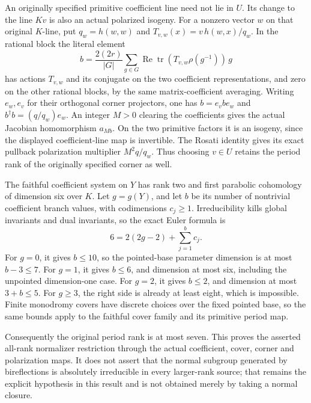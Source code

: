 An originally specified primitive coefficient line need not
lie in \(U\). Its change to the line \(Kv\) is also an
actual polarized isogeny. For a nonzero vector \(w\) on
that original \(K\)-line, put \(q_w=h(w,w)\) and
\(T_{v,w}(x)=v\,h(w,x)/q_w\). In the rational block the
literal element
\[
 b=\frac{2(2r)}{|G|}\sum_{g\in G}
       \operatorname{Re}\operatorname{tr}
               (T_{v,w}\rho(g^{-1}))\,g                    \tag{G29.15a}
\]
has actions \(T_{v,w}\) and its conjugate on the two
coefficient representations, and zero on the other rational
blocks, by the same matrix-coefficient averaging.
Writing \(e_w,e_v\) for their orthogonal corner projectors,
one has \(b=e_vbe_w\) and
\(b^\dagger b=(q/q_w)e_w\).
An integer \(M>0\) clearing the coefficients gives the
actual Jacobian homomorphism \(a_{Mb}\). On the two
primitive factors it is an isogeny, since the displayed
coefficient-line map is invertible. The Rosati identity gives
its exact pullback polarization multiplier \(M^2q/q_w\).
Thus choosing \(v\in U\) retains the period rank of the
originally specified corner as well.

The faithful coefficient system on \(Y\) has rank two
and first parabolic cohomology of dimension six over \(K\).
Let \(g=g(Y)\), and let \(b\) be its number of nontrivial
coefficient branch values, with codimensions \(c_j\ge1\).
Irreducibility kills global invariants and dual invariants,
so the exact Euler formula is
\[
                       6=2(2g-2)+\sum_{j=1}^b c_j.         \tag{G29.16}
\]
For \(g=0\), it gives \(b\le10\), so the pointed-base
parameter dimension is at most \(b-3\le7\). For \(g=1\),
it gives \(b\le6\), and dimension at most six, including
the unpointed dimension-one case. For \(g=2\), it gives
\(b\le2\), and dimension at most \(3+b\le5\).
For \(g\ge3\), the right side is already at least eight,
which is impossible. Finite monodromy covers have discrete
choices over the fixed pointed base, so the same bounds apply
to the faithful cover family and its primitive period map.

Consequently the original period rank is at most seven.
This proves the asserted all-rank normalizer restriction
through the actual coefficient, cover, corner and
polarization maps. It does not assert that the normal subgroup
generated by bireflections is absolutely irreducible in every
larger-rank source; that remains the explicit hypothesis
in this result and is not obtained merely by taking a
normal closure.
